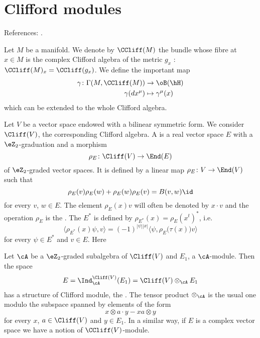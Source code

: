 \section{Clifford modules}  \label{susec_Cliffmodule}

References: \cite{ResEtaDiracType,mellor}.

Let $M$ be a manifold. We denote by $\CCliff(M)$ the bundle whose fibre at $x\in M$ is the complex Clifford algebra of the metric $g_x$ : $\CCliff(M)_x=\CCliff(g_x)$. We define the important map
\begin{equation}
\begin{aligned}
 \gamma\colon \Gamma(M,\CCliff(M))&\to \oB(\hH) \\ 
\gamma(dx^{\mu})&\mapsto \gamma^{\mu}(x)  
\end{aligned}
\end{equation}
which can be extended to the whole Clifford algebra.

Let $V$ be a vector space endowed with a bilinear symmetric form. We consider $\Cliff(V)$, the corresponding Clifford algebra. A  is a real vector space $E$ with a $\eZ_2$-graduation and a morphism 
\[ 
  \rho_E\colon \Cliff(V)\to \End(E)
\]
of $\eZ_2$-graded vector spaces. It is defined by a linear map $\rho_E\colon V\to \End(V)$ such that
\begin{equation}
\rho_E(v)\rho_E(w)+\rho_E(w)\rho_E(v)=B(v,w)\id
\end{equation}
for every $v$, $w\in E$. The element $\rho_E(x)v$ will often be denoted by $x\cdot v$ and the operation $\rho_E$ is the . The  $E^*$ is defined by $\rho_{E^*}(x)=\rho_E(x^t)^*$, i.e.
\begin{equation}
\langle \rho_{E^*}(x)\psi,v \rangle =(-1)^{| \psi | |x |}\langle \psi, \rho_E\big( \tau(x) \big)v\rangle 
\end{equation}
for every $\psi\in E^*$ and $v\in E$. Here

Let $\cA$ be a $\eZ_2$-graded subalgebra of $\Cliff(V)$ and $E_1$, a $\cA$-module. Then the space
\[ 
  E=\Ind_{\cA}^{\Cliff(V)}(E_1)=\Cliff(V)\otimes_{\cA}E_1
\]
has a structure of Clifford module, the . The tensor product $\otimes_{\cA}$ is the usual one modulo the subspace spanned by elements of the form 
\[ 
  x\otimes a\cdot y-xa\otimes y
\]
for every $x$, $a\in\Cliff(V)$ and $y\in E_1$. In a similar way, if $E$ is a complex vector space we have a notion of $\CCliff(V)$-module. 

